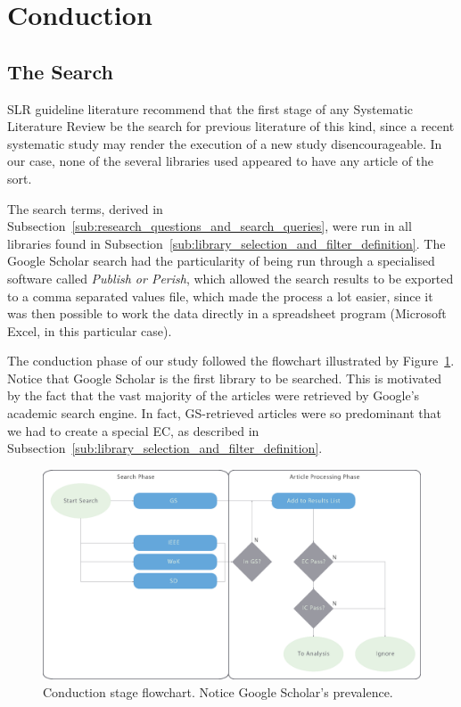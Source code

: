 \section{Conduction}
\label{sec:conduction}
\subsection{The Search}
\label{sub:the_search}

SLR guideline literature \cite{Kitchenham2007,Tacconelli2010} recommend
that the first stage of any Systematic Literature Review be the search
for previous literature of this kind, since a recent systematic study
may render the execution of a new study disencourageable. In our case,
none of the several libraries used appeared to have any article of the
sort.

The search terms, derived in
Subsection~\ref{sub:research_questions_and_search_queries}, were run in
all libraries found in
Subsection~\ref{sub:library_selection_and_filter_definition}. The Google
Scholar search had the particularity of being run through a specialised
software called \textit{Publish or Perish}\cite{Harzing}, which allowed
the search results to be exported to a comma separated values file,
which made the process a lot easier, since it was then possible to work
the data directly in a spreadsheet program (Microsoft Excel, in this
particular case).

The conduction phase of our study followed the flowchart illustrated by
Figure~\ref{fig:flowchart}. Notice that Google Scholar is the first
library to be searched. This is motivated by the fact that the vast
majority of the articles were retrieved by Google's academic search
engine. In fact, GS-retrieved articles were so predominant that we had
to create a special EC, as described in
Subsection~\ref{sub:library_selection_and_filter_definition}.

\begin{figure}[htpb]
    \centering
    \includegraphics[width=\linewidth]{img/flowchart.eps}
    \caption{Conduction stage flowchart. Notice Google Scholar's
    prevalence.}
    \label{fig:flowchart}
\end{figure}

